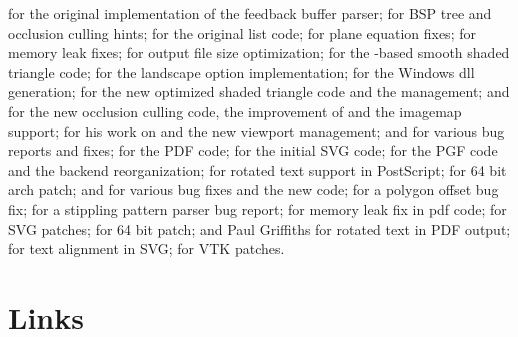 for the original implementation of
the feedback buffer parser;
%
 for BSP tree and occlusion
culling hints;
%
 for the original list
code;
%
 for plane equation
fixes;
%
 for memory leak fixes;
%
 for output file size optimization;
%
 for the -based smooth shaded
triangle code;
%
 for the landscape option
implementation;
%
 for the Windows dll generation;
%
 for the new optimized
shaded triangle code and the  management;
%
 and  for the new occlusion culling code, the
improvement of  and the imagemap support;
%
 for his work on
 and the new viewport management;
%
 and  for various bug reports and fixes;
%
 for the PDF code;
%
 for the initial SVG code;
%
 for the PGF code and the
backend reorganization;
%
 for rotated text support in
PostScript;
%
 for 64 bit arch patch;
%
 and  for various bug fixes and the new
 code;
%
 for a polygon offset bug
fix;
%
 for a
stippling pattern parser bug report;
%
 for memory leak fix
in pdf code;
%
 for SVG patches;
%
 for 64 bit patch;
%
 and Paul Griffiths for
rotated text in PDF output;
%
 for text alignment in SVG;
%
 for VTK patches.

\section{Links}
\label{sec:links}

